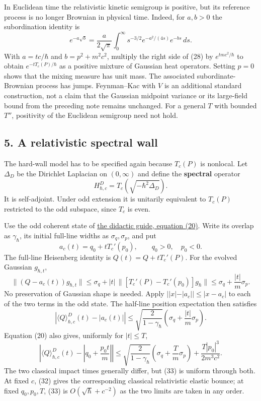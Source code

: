 \documentclass[11pt,a4paper]{article}
\begin{document}
In Euclidean time the relativistic kinetic semigroup is positive, but
its reference process is no longer Brownian in physical time. Indeed,
for \(a,b>0\) the subordination identity is
\[e^{-a\sqrt b}=\frac a{2\sqrt\pi}\int_0^\infty
 s^{-3/2}e^{-a^2/(4s)}e^{-bs}\,ds.\tag{28}\] With \(a=tc/\hbar\) and
\(b=p^2+m^2c^2\), multiply the right side of (28) by \(e^{tmc^2/\hbar}\)
to obtain \(e^{-tT_c(P)/\hbar}\) as a positive mixture of Gaussian heat
operators. Setting \(p=0\) shows that the mixing measure has unit mass.
The associated subordinate-Brownian process has jumps. Feynman--Kac with
\(V\) is an additional standard construction, not a claim that the
Gaussian midpoint variance or its large-field bound from the preceding
note remains unchanged. For a general \(T\) with bounded \(T''\),
positivity of the Euclidean semigroup need not hold.

\hypertarget{a-relativistic-spectral-wall}{%
\subsection{5. A relativistic spectral
wall}\label{a-relativistic-spectral-wall}}

The hard-wall model has to be specified again because \(T_c(P)\) is
nonlocal. Let \(\Delta_D\) be the Dirichlet Laplacian on \((0,\infty)\)
and define the \textbf{spectral} operator \[H_{\hbar,c}^{D}
 =T_c\!\left(\sqrt{-\hbar^2\Delta_D}\right).\tag{29}\] It is
self-adjoint. Under odd extension it is unitarily equivalent to
\(T_c(P)\) restricted to the odd subspace, since \(T_c\) is even.

Use the odd coherent state of
\href{groupoid-quantum-newton-states.md\#6-regulators-and-a-normalized-blocking-test}{the
didactic guide, equation (20)}. Write its overlap as \(\gamma_\hbar\),
its initial full-line widths as \(\sigma_q,\sigma_p\), and put
\[a_c(t)=q_0+tT_c'(p_0),\qquad q_0>0,\quad p_0<0.\tag{30}\] The
full-line Heisenberg identity is \(Q(t)=Q+tT_c'(P)\). For the evolved
Gaussian \(g_{\hbar,t}\), \[
 \|(Q-a_c(t))g_{\hbar,t}\|
 \le\sigma_q+|t|\,\|[T_c'(P)-T_c'(p_0)]g_\hbar\|
 \le\sigma_q+\frac{|t|}{m}\sigma_p.\tag{31}
\] No preservation of Gaussian shape is needed. Apply
\(||x|-|a_c||\le|x-a_c|\) to each of the two terms in the odd state. The
half-line position expectation then satisfies \[
 \left|\langle Q\rangle_{\hbar,c}^{D}(t)-|a_c(t)|\right|
 \le\sqrt{\frac2{1-\gamma_\hbar}}
             \left(\sigma_q+\frac{|t|}{m}\sigma_p\right).\tag{32}
\] Equation (20) also gives, uniformly for \(|t|\le T\), \[
 \left|\langle Q\rangle_{\hbar,c}^{D}(t)
          -\left|q_0+\frac{p_0t}{m}\right|\right|
 \le\sqrt{\frac2{1-\gamma_\hbar}}
             \left(\sigma_q+\frac{T}{m}\sigma_p\right)
      +\frac{T|p_0|^3}{2m^3c^2}.\tag{33}
\] The two classical impact times generally differ, but (33) is uniform
through both. At fixed \(c\), (32) gives the corresponding classical
relativistic elastic bounce; at fixed \(q_0,p_0,T\), (33) is
\(O(\sqrt\hbar+c^{-2})\) as the two limits are taken in any order.
\end{document}
